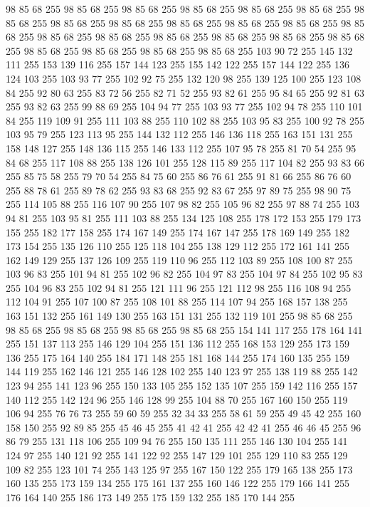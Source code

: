 98 85 68 255 98 85 68 255 98 85 68 255 98 85 68 255 98 85 68 255 98 85 68 255 98 85 68 255 98 85 68 255 98 85 68 255 98 85 68 255 98 85 68 255 98 85 68 255 98 85 68 255 98 85 68 255 98 85 68 255 98 85 68 255 98 85 68 255 98 85 68 255 98 85 68 255 98 85 68 255 98 85 68 255 98 85 68 255 98 85 68 255 103 90 72 255 145 132 111 255 153 139 116 255 157 144 123 255 155 142 122 255 157 144 122 255 136 124 103 255 103 93 77 255 102 92 75 255 132 120 98 255 139 125 100 255 123 108 84 255 92 80 63 255 83 72 56 255 82 71 52 255 93 82 61 255 95 84 65 255 92 81 63 255 93 82 63 255 99 88 69 255 104 94 77 255 103 93 77 255 102 94 78 255 110 101 84 255 119 109 91 255 111 103 88 255 110 102 88 255 103 95 83 255 100 92 78 255 103 95 79 255 123 113 95 255 144 132 112 255 146 136 118 255 163 151 131 255 158 148 127 255 148 136 115 255 146 133 112 255 107 95 78 255 81 70 54 255 95 84 68 255 117 108 88 255
138 126 101 255 128 115 89 255 117 104 82 255 93 83 66 255 85 75 58 255 79 70 54 255 84 75 60 255 86 76 61 255 91 81 66 255 86 76 60 255 88 78 61 255 89 78 62 255 93 83 68 255 92 83 67 255 97 89 75 255 98 90 75 255 114 105 88 255 116 107 90 255 107 98 82 255 105 96 82 255 97 88 74 255 103 94 81 255 103 95 81 255 111 103 88 255 134 125 108 255 178 172 153 255 179 173 155 255 182 177 158 255 174 167 149 255 174 167 147 255 178 169 149 255 182 173 154 255 135 126 110 255 125 118 104 255 138 129 112 255 172 161 141 255 162 149 129 255 137 126 109 255 119 110 96 255 112 103 89 255 108 100 87 255 103 96 83 255 101 94 81 255 102 96 82 255 104 97 83 255 104 97 84 255 102 95 83 255 104 96 83 255 102 94 81 255 121 111 96 255 121 112 98 255 116 108 94 255 112 104 91 255 107 100 87 255 108 101 88 255 114 107 94 255 168 157 138 255 163 151 132 255 161 149 130 255 163 151 131 255 132 119 101 255 98 85 68 255 98 85 68 255 98 85 68 255
98 85 68 255 98 85 68 255 154 141 117 255 178 164 141 255 151 137 113 255 146 129 104 255 151 136 112 255 168 153 129 255 173 159 136 255 175 164 140 255 184 171 148 255 181 168 144 255 174 160 135 255 159 144 119 255 162 146 121 255 146 128 102 255 140 123 97 255 138 119 88 255 142 123 94 255 141 123 96 255 150 133 105 255 152 135 107 255 159 142 116 255 157 140 112 255 142 124 96 255 146 128 99 255 104 88 70 255 167 160 150 255 119 106 94 255 76 76 73 255 59 60 59 255 32 34 33 255 58 61 59 255 49 45 42 255 160 158 150 255 92 89 85 255 45 46 45 255 41 42 41 255 42 42 41 255 46 46 45 255 96 86 79 255 131 118 106 255 109 94 76 255 150 135 111 255 146 130 104 255 141 124 97 255 140 121 92 255 141 122 92 255 147 129 101 255 129 110 83 255 129 109 82 255 123 101 74 255 143 125 97 255 167 150 122 255 179 165 138 255 173 160 135 255 173 159 134 255 175 161 137 255 160 146 122 255 179 166 141 255 176 164 140 255 186 173 149 255 175 159 132 255 185 170 144 255
